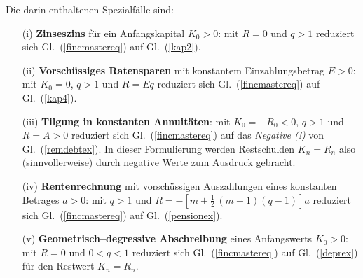 \medskip
\noindent
Die darin enthaltenen Spezialf\"alle sind:
%
\begin{itemize}
\item[(i)] {\bf Zinseszins} f\"ur ein Anfangskapital $K_{0}>0$:
mit $R=0$ und $q>1$ reduziert sich Gl.~(\ref{fincmastereq}) auf
Gl.~(\ref{kap2}).

\item[(ii)] {\bf Vorsch\"ussiges Ratensparen} mit konstantem
Einzahlungsbetrag $E>0$: mit $K_{0}=0$, $q>1$ und $R=Eq$
reduziert sich Gl.~(\ref{fincmastereq}) auf Gl.~(\ref{kap4}).

\item[(iii)] {\bf Tilgung in konstanten Annuit\"aten}:
mit $K_{0}=-R_{0}<0$, $q>1$ und $R=A>0$ reduziert sich
Gl.~(\ref{fincmastereq}) auf das {\em Negative (!)\/}  von
Gl.~(\ref{remdebtex}). In dieser Formulierung werden
Restschulden $K_{n}=R_{n}$ also (sinnvollerweise) durch
negative Werte zum Ausdruck gebracht.

\item[(iv)] {\bf Rentenrechnung} mit vorsch\"ussigen Auszahlungen
eines konstanten Betrages $a>0$:
mit $q>1$ und $\displaystyle R=-\left[m
+\frac{1}{2}\,(m+1)(q-1)\right]a$
reduziert sich Gl.~(\ref{fincmastereq}) auf
Gl.~(\ref{pensionex}).

\item[(v)] {\bf Geometrisch--degressive Abschreibung}
eines Anfangswerts $K_{0}>0$: mit $R=0$ und $0<q<1$
reduziert sich Gl.~(\ref{fincmastereq}) auf
Gl.~(\ref{deprex}) f\"ur den Restwert $K_{n}=R_{n}$.

\end{itemize}
%

